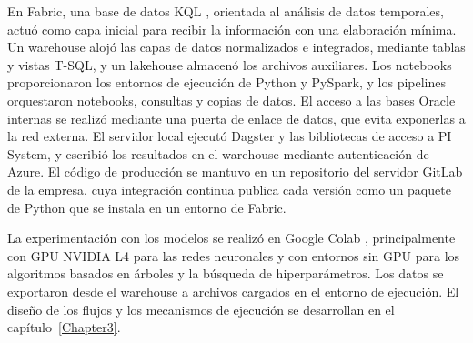 En Fabric, una base de datos KQL \cite{microsoftFabricKQL}, orientada al análisis de datos temporales, actuó como capa inicial para recibir la información con una elaboración mínima. Un warehouse \cite{microsoftFabricWarehouse} alojó las capas de datos normalizados e integrados, mediante tablas y vistas T-SQL, y un lakehouse \cite{microsoftFabricLakehouse} almacenó los archivos auxiliares. Los notebooks proporcionaron los entornos de ejecución de Python y PySpark, y los pipelines \cite{microsoftFabricPipeline} orquestaron notebooks, consultas y copias de datos. El acceso a las bases Oracle internas se realizó mediante una puerta de enlace de datos, que evita exponerlas a la red externa. El servidor local ejecutó Dagster y las bibliotecas de acceso a PI System, y escribió los resultados en el warehouse mediante autenticación de Azure. El código de producción se mantuvo en un repositorio del servidor GitLab de la empresa, cuya integración continua publica cada versión como un paquete de Python que se instala en un entorno de Fabric.

La experimentación con los modelos se realizó en Google Colab \cite{googleColab}, principalmente con GPU NVIDIA L4 para las redes neuronales y con entornos sin GPU para los algoritmos basados en árboles y la búsqueda de hiperparámetros. Los datos se exportaron desde el warehouse a archivos cargados en el entorno de ejecución. El diseño de los flujos y los mecanismos de ejecución se desarrollan en el capítulo~\ref{Chapter3}.
